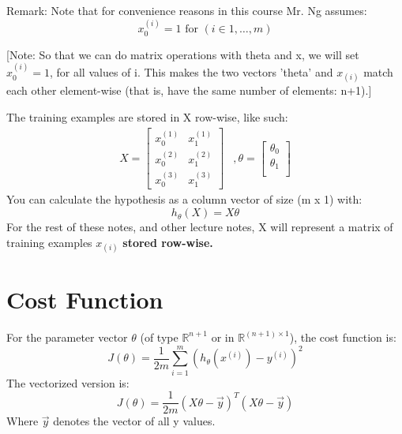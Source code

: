 Remark: Note that for convenience reasons in this course Mr. Ng assumes: $$ x_{0}^{(i)}  =1 \text{ for }  (i\in { 1,\dots, m } )$$

[Note: So that we can do matrix operations with theta and x, we will set $x^{(i)}_0 = 1$, for all values of i. This makes the two vectors 'theta' and $x_{(i)}$ match each other element-wise (that is, have the same number of elements: n+1).]

The training examples are stored in X row-wise, like such:
\begin{align*}
X = 
\begin{bmatrix}
x^{(1)}_0 & x^{(1)}_1  \\ x^{(2)}_0 & x^{(2)}_1  \\ x^{(3)}_0 & x^{(3)}_1 
\end{bmatrix}
&,\theta = 
\begin{bmatrix}
\theta_0 \\ 
\theta_1 \\ 
\end{bmatrix} 
\end{align*}
You can calculate the hypothesis as a column vector of size (m x 1) with:
\begin{equation}
h_\theta (X)=X\theta
\end{equation}
For the rest of these notes, and other lecture notes, X will represent a matrix of training examples $x_{(i)}$ {\bf stored row-wise.}
\section*{Cost Function}
For the parameter vector $\theta$ (of type $\mathbb{R} ^{n+1}$ or in $\mathbb{R} ^{(n+1)\times 1}$), the cost function is:
\begin{equation}
J(\theta) = \frac{1}{2m} \sum_{i=1}^m \left(h_\theta (x^{(i)}) - y^{(i)} \right)^2
\end{equation}
The vectorized version is:
\begin{equation}
J(\theta) = \frac{1}{2m} (X\theta - \vec{y})^T (X\theta - \vec{y})
\end{equation}
Where $\vec{y}$ denotes the vector of all y values.
